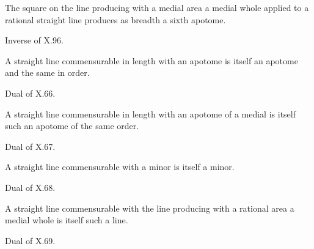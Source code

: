 \documentclass{rrxiv}
\begin{document}
\begin{claim}
\label{prop:X.102}
The square on the line producing with a medial area a medial whole
applied to a rational straight line produces as breadth a sixth
apotome.
\end{claim}
\begin{evidence}[Proof of X.102]
\label{ev:X.102}
Inverse of X.96.
\end{evidence}

\begin{claim}
\label{prop:X.103}
A straight line commensurable in length with an apotome is itself an
apotome and the same in order.
\end{claim}
\begin{evidence}[Proof of X.103]
\label{ev:X.103}
Dual of X.66.
\end{evidence}

\begin{claim}
\label{prop:X.104}
A straight line commensurable in length with an apotome of a medial
is itself such an apotome of the same order.
\end{claim}
\begin{evidence}[Proof of X.104]
\label{ev:X.104}
Dual of X.67.
\end{evidence}

\begin{claim}
\label{prop:X.105}
A straight line commensurable with a minor is itself a minor.
\end{claim}
\begin{evidence}[Proof of X.105]
\label{ev:X.105}
Dual of X.68.
\end{evidence}

\begin{claim}
\label{prop:X.106}
A straight line commensurable with the line producing with a rational
area a medial whole is itself such a line.
\end{claim}
\begin{evidence}[Proof of X.106]
\label{ev:X.106}
Dual of X.69.
\end{evidence}
\end{document}
